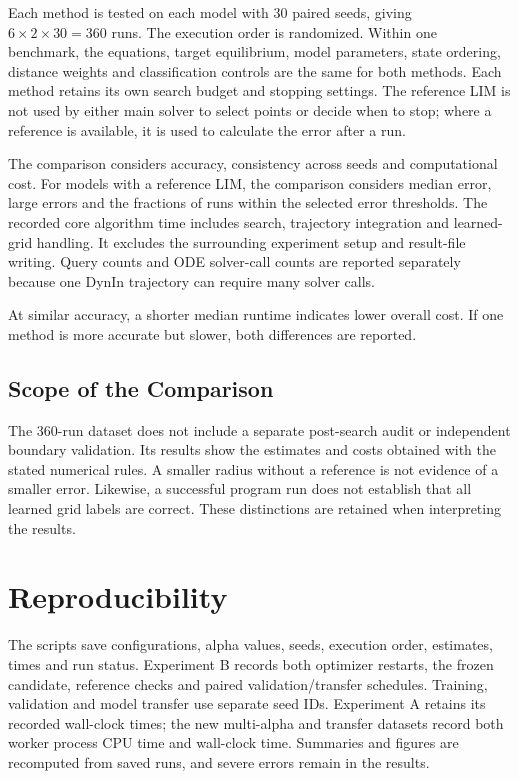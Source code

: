 Each method is tested on each model with 30 paired seeds, giving $6\times2\times30=360$ runs. The execution order is randomized. Within one benchmark, the equations, target equilibrium, model parameters, state ordering, distance weights and classification controls are the same for both methods. Each method retains its own search budget and stopping settings. The reference LIM is not used by either main solver to select points or decide when to stop; where a reference is available, it is used to calculate the error after a run.

\begin{revision}
The comparison considers accuracy, consistency across seeds and computational cost. For models with a reference LIM, the comparison considers median error, large errors and the fractions of runs within the selected error thresholds. The recorded core algorithm time includes search, trajectory integration and learned-grid handling. It excludes the surrounding experiment setup and result-file writing. Query counts and ODE solver-call counts are reported separately because one DynIn trajectory can require many solver calls.
\end{revision}

At similar accuracy, a shorter median runtime indicates lower overall cost. If one method is more accurate but slower, both differences are reported.

\subsection{Scope of the Comparison}

The 360-run dataset does not include a separate post-search audit or independent boundary validation. Its results show the estimates and costs obtained with the stated numerical rules. A smaller radius without a reference is not evidence of a smaller error. Likewise, a successful program run does not establish that all learned grid labels are correct. These distinctions are retained when interpreting the results.

\section{Reproducibility}

\begin{bluerevision}
The scripts save configurations, alpha values, seeds, execution order, estimates, times and run status. Experiment B records both optimizer restarts, the frozen candidate, reference checks and paired validation/transfer schedules. Training, validation and model transfer use separate seed IDs. Experiment A retains its recorded wall-clock times; the new multi-alpha and transfer datasets record both worker process CPU time and wall-clock time. Summaries and figures are recomputed from saved runs, and severe errors remain in the results.
\end{bluerevision}
